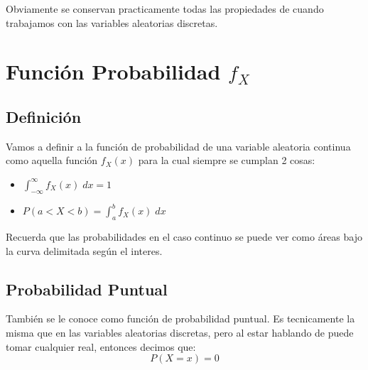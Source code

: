 \documentclass[12pt, fleqn]{report}                             %
\theoremstyle{break}                                            %
\begin{document}
                Obviamente se conservan practicamente todas las propiedades de cuando trabajamos con las
                variables aleatorias discretas.

        \clearpage
        \section{Función Probabilidad $f_X$}

            \subsection{Definición}

                Vamos a definir a la función de probabilidad de una variable
                aleatoria continua como aquella función $f_X(x)$ para la cual siempre se cumplan 2 cosas:
                \begin{itemize}
                    \item 
                        $\displaystyle \int_{-\infty}^\infty f_X(x) \; dx = 1$

                    \item 
                        $\displaystyle P(a < X < b) = \int_a^b f_X(x) \; dx$
                \end{itemize}

                Recuerda que las probabilidades en el caso continuo se puede ver como áreas bajo la curva
                delimitada según el interes.


            \subsection{Probabilidad Puntual}

                También se le conoce como función de probabilidad puntual.
                Es tecnicamente la misma que en las variables aleatorias discretas, pero
                al estar hablando de puede tomar cualquier real, entonces decimos que:
                \begin{equation*}
                    P(X = x) = 0
                \end{equation*}
\end{document}
